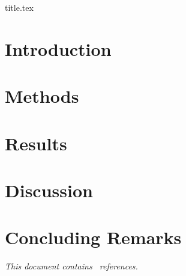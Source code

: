 \documentclass[12pt]{report}
\begin{document}
{title.tex}
\begin{acknowledgments}
\end{acknowledgments}
\begin{abstract}
\emph{}
\end{abstract}
\begin{preface}
\end{preface}
\newpage
\tableofcontents
\setcounter{page}{3}
\newpage

\chapter{Introduction} \label{ch2}

\chapter{Methods} \label{ch3}

\chapter{Results} \label{ch4}

\chapter{Discussion} \label{ch5}

\chapter{Concluding Remarks}\label{ch6}

{}  
{\emph{This document contains \ references.}}
\appendix
\end{document}
